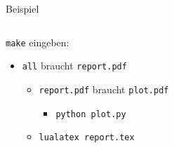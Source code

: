 \begin{frame}[fragile]{Beispiel}
  \begin{center}
    \inputminted{make}{example-files/First-report}
  \end{center}
  \vspace{1em}

  \texttt{make} eingeben:
  \begin{itemize}
    \item \texttt{all} braucht \texttt{report.pdf}
      \begin{itemize}
        \item \texttt{report.pdf} braucht \texttt{plot.pdf}
          \begin{itemize}
            \item \texttt{python plot.py}
          \end{itemize}
        \item \texttt{lualatex report.tex}
    \end{itemize}
  \end{itemize}
\end{frame}
